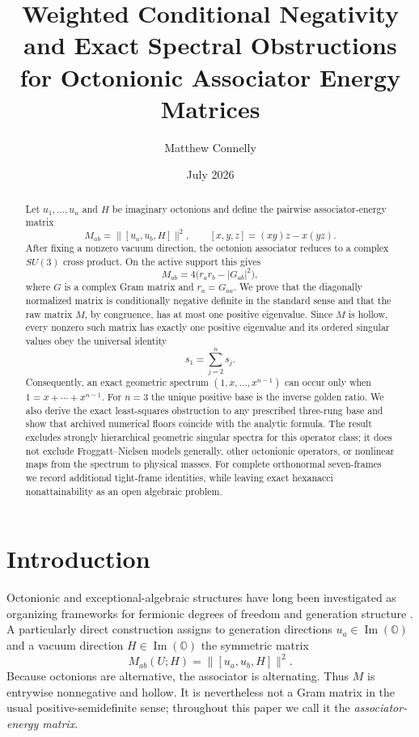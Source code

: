 \documentclass[11pt]{article}
\title{Weighted Conditional Negativity and Exact Spectral Obstructions\\
for Octonionic Associator Energy Matrices}
\author{Matthew Connelly}
\date{July 2026}
\newcommand{\Oa}{\mathbb{O}}
\newcommand{\norm}[1]{\lVert #1\rVert}
\newcommand{\abs}[1]{\lvert #1\rvert}
\theoremstyle{remark}
\begin{document}
\maketitle

\begin{abstract}
Let $u_1,\ldots,u_n$ and $H$ be imaginary octonions and define the pairwise associator-energy matrix
\[
 M_{ab}=\norm{[u_a,u_b,H]}^2,
 \qquad [x,y,z]=(xy)z-x(yz).
\]
After fixing a nonzero vacuum direction, the octonion associator reduces to a complex $SU(3)$ cross product.  On the active support this gives
\[
 M_{ab}=4\bigl(r_a r_b-\abs{G_{ab}}^2\bigr),
\]
where $G$ is a complex Gram matrix and $r_a=G_{aa}$.  We prove that the diagonally normalized matrix is conditionally negative definite in the standard sense and that the raw matrix $M$, by congruence, has at most one positive eigenvalue.  Since $M$ is hollow, every nonzero such matrix has exactly one positive eigenvalue and its ordered singular values obey the universal identity
\[
 s_1=\sum_{j=2}^n s_j.
\]
Consequently, an exact geometric spectrum $(1,x,\ldots,x^{n-1})$ can occur only when $1=x+\cdots+x^{n-1}$.  For $n=3$ the unique positive base is the inverse golden ratio.  We also derive the exact least-squares obstruction to any prescribed three-rung base and show that archived numerical floors coincide with the analytic formula.  The result excludes strongly hierarchical geometric singular spectra for this operator class; it does not exclude Froggatt--Nielsen models generally, other octonionic operators, or nonlinear maps from the spectrum to physical masses.  For complete orthonormal seven-frames we record additional tight-frame identities, while leaving exact hexanacci nonattainability as an open algebraic problem.
\end{abstract}

\section{Introduction}

Octonionic and exceptional-algebraic structures have long been investigated as organizing frameworks for fermionic degrees of freedom and generation structure \cite{GunaydinGursey1973,Baez2002}.  A particularly direct construction assigns to generation directions $u_a\in\operatorname{Im}(\Oa)$ and a vacuum direction $H\in\operatorname{Im}(\Oa)$ the symmetric matrix
\begin{equation}
 M_{ab}(U;H)=\norm{[u_a,u_b,H]}^2.
 \label{eq:def-M}
\end{equation}
Because octonions are alternative, the associator is alternating.  Thus $M$ is entrywise nonnegative and hollow.  It is nevertheless not a Gram matrix in the usual positive-semidefinite sense; throughout this paper we call it the \emph{associator-energy matrix}.
\end{document}
